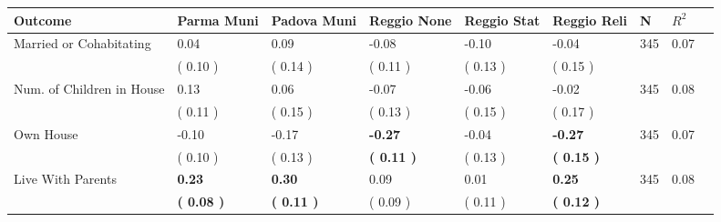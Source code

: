 \begin{tabular}{L{6.2cm} C{1.8cm} C{1.8cm} C{1.8cm} C{1.8cm} C{1.8cm} C{1.8cm} C{0.3cm} C{0.3cm}}
\toprule
 \textbf{Outcome} & \textbf{Parma Muni} & \textbf{Padova Muni} & \textbf{Reggio None} & \textbf{Reggio Stat} & \textbf{Reggio Reli} & \textbf{N} & \textbf{$ R^2$} \\
\midrule
Married or Cohabitating &      0.04 &      0.09 &     -0.08 &     -0.10 &     -0.04  & 345 &       0.07 \\ 
 & (     0.10 ) & (     0.14 ) & (     0.11 ) & (     0.13 ) & (     0.15 )  & \\
Num. of Children in House &      0.13 &      0.06 &     -0.07 &     -0.06 &     -0.02  & 345 &       0.08 \\ 
 & (     0.11 ) & (     0.15 ) & (     0.13 ) & (     0.15 ) & (     0.17 )  & \\
Own House &     -0.10 &     -0.17 & \textbf{    -0.27} &     -0.04 & \textbf{    -0.27}  & 345 &       0.07 \\ 
 & (     0.10 ) & (     0.13 ) & \textbf{(     0.11 )} & (     0.13 ) & \textbf{(     0.15 )}  & \\
Live With Parents & \textbf{     0.23} & \textbf{     0.30} &      0.09 &      0.01 & \textbf{     0.25}  & 345 &       0.08 \\ 
 & \textbf{(     0.08 )} & \textbf{(     0.11 )} & (     0.09 ) & (     0.11 ) & \textbf{(     0.12 )}  & \\
\bottomrule
\end{tabular}
